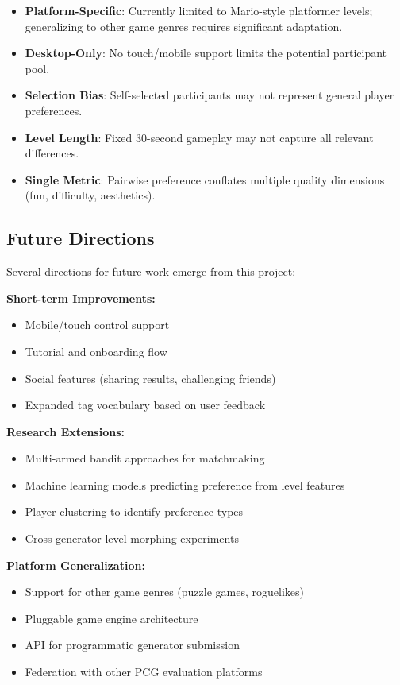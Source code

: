 \documentclass[11pt,a4paper]{article}
\theoremstyle{plain}
\theoremstyle{definition}
\theoremstyle{remark}
\begin{document}
\begin{itemize}
    \item \textbf{Platform-Specific}: Currently limited to Mario-style platformer levels; generalizing to other game genres requires significant adaptation.
    
    \item \textbf{Desktop-Only}: No touch/mobile support limits the potential participant pool.
    
    \item \textbf{Selection Bias}: Self-selected participants may not represent general player preferences.
    
    \item \textbf{Level Length}: Fixed 30-second gameplay may not capture all relevant differences.
    
    \item \textbf{Single Metric}: Pairwise preference conflates multiple quality dimensions (fun, difficulty, aesthetics).
\end{itemize}

\subsection{Future Directions}
\label{subsec:future}

Several directions for future work emerge from this project:

\textbf{Short-term Improvements:}
\begin{itemize}
    \item Mobile/touch control support
    \item Tutorial and onboarding flow
    \item Social features (sharing results, challenging friends)
    \item Expanded tag vocabulary based on user feedback
\end{itemize}

\textbf{Research Extensions:}
\begin{itemize}
    \item Multi-armed bandit approaches for matchmaking
    \item Machine learning models predicting preference from level features
    \item Player clustering to identify preference types
    \item Cross-generator level morphing experiments
\end{itemize}

\textbf{Platform Generalization:}
\begin{itemize}
    \item Support for other game genres (puzzle games, roguelikes)
    \item Pluggable game engine architecture
    \item API for programmatic generator submission
    \item Federation with other PCG evaluation platforms
\end{itemize}
\end{document}
